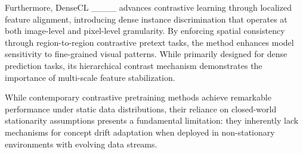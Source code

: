 Furthermore, DenseCL ____  advances contrastive learning through localized feature alignment, introducing dense instance discrimination that operates at both image-level and pixel-level granularity. By enforcing spatial consistency through region-to-region contrastive pretext tasks, the method enhances model sensitivity to fine-grained visual patterns. While primarily designed for dense prediction tasks, its hierarchical contrast mechanism demonstrates the importance of multi-scale feature stabilization.

While contemporary contrastive pretraining methods achieve remarkable performance under static data distributions, their reliance on closed-world stationarity assumptions presents a fundamental limitation: they inherently lack mechanisms for concept drift adaptation when deployed in non-stationary environments with evolving data streams.